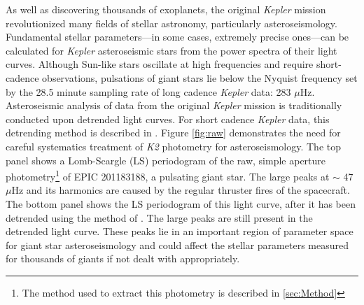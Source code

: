 \documentclass[useAMS, usenatbib, preprint, 12pt]{aastex}
\begin{document}
As well as discovering thousands of exoplanets, the original {\it Kepler}
mission revolutionized many fields of stellar astronomy, particularly
asteroseismology.
Fundamental stellar parameters---in some cases, extremely precise ones---can
be calculated for {\it Kepler} asteroseismic stars from the power spectra of
their light curves.
Although Sun-like stars oscillate at high frequencies and require
short-cadence observations, pulsations of giant stars lie below the Nyquist
frequency set by the 28.5 minute sampling rate of long cadence {\it Kepler}
data: 283 $\mu$Hz.
Asteroseismic analysis of data from the original {\it Kepler} mission is
traditionally conducted upon detrended light curves.
For short cadence {\it Kepler} data, this detrending method is described in
\citet{Garcia2011}.
Figure \ref{fig:raw} demonstrates the need for careful systematics treatment
of {\it K2} photometry for asteroseismology.
The top panel shows a Lomb-Scargle (LS) periodogram of the raw, simple aperture
photometry\footnote{The method used to extract this photometry is described in
\textsection \ref{sec:Method}} of EPIC 201183188, a pulsating giant star.
The large peaks at $\sim$ 47 $\mu$Hz and its harmonics are caused by the
regular thruster fires of the spacecraft.
The bottom panel shows the LS periodogram of this light curve, after
it has been detrended using the method of \citet{Vanderburg2014}.
The large peaks are still present in the detrended light curve.
These peaks lie in an important region of parameter space for giant star
asteroseismology and could affect the stellar parameters measured for thousands
of giants if not dealt with appropriately.
\end{document}
